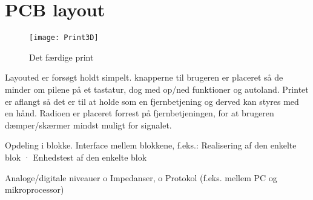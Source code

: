 \documentclass[Main]{subfiles}
\begin{document}
\section{PCB layout}

\begin{figure}[H]
\centering
\texttt{[image: Print3D]}
\caption{Det færdige print}
\label{fig: Print3D}
\end{figure}

Layouted er forsøgt holdt simpelt. knapperne til brugeren er placeret så de minder om pilene på et tastatur, dog med op/ned funktioner og autoland.
Printet er aflangt så det er til at holde som en fjernbetjening og derved kan styres med en hånd.
Radioen er placeret forrest på fjernbetjeningen, for at brugeren dæmper/skærmer mindst muligt for signalet.  

Opdeling i blokke.
Interface mellem blokkene, f.eks.:
Realisering af den enkelte blok
· Enhedstest af den enkelte blok

Analoge/digitale niveauer
o Impedanser,
o Protokol (f.eks. mellem PC og mikroprocessor)
\end{document}

